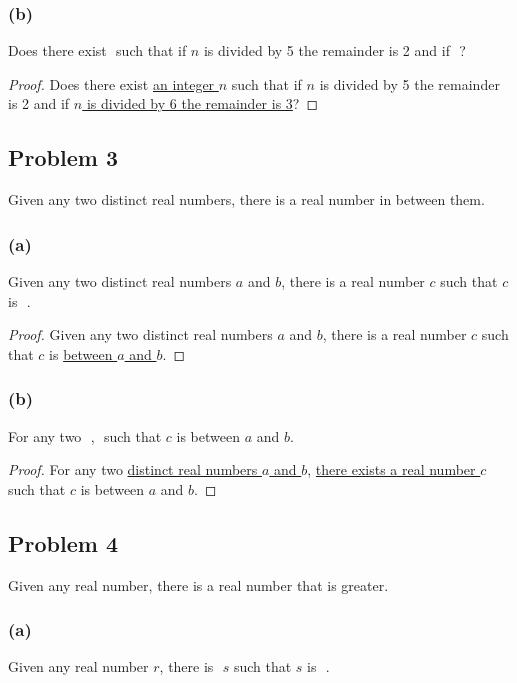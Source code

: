 \documentclass[14pt]{extarticle}
\newcommand{\fbl}{\underline{\hspace{1cm}}\,\,}
\begin{document}
\subsubsection{(b)}
Does there exist \fbl such that if $n$ is divided by 5 the remainder is 2 and if \fbl?

\begin{proof}
    Does there exist \underline{an integer $n$} such that if $n$ is
    divided by 5 the remainder is 2 and if \underline{$n$ is divided by 6 the
        remainder is 3}?
\end{proof}

\subsection{Problem 3}
Given any two distinct real numbers,
there is a real number in between them.

\subsubsection{(a)}
Given any two distinct real numbers $a$ and $b$,
there is a real number $c$ such that $c$ is \fbl.

\begin{proof}
    Given any two distinct real numbers $a$ and $b$, there is a real number $c$ such
    that $c$ is \underline{between $a$ and $b$}.
\end{proof}

\subsubsection{(b)}
For any two \fbl, \fbl such that $c$ is between $a$ and $b$.

\begin{proof}
    For any two \underline{distinct real numbers $a$ and $b$}, \underline{there
        exists a real number $c$} such that $c$ is between $a$ and $b$.
\end{proof}

\subsection{Problem 4}
Given any real number, there is a real number that is greater.

\subsubsection{(a)}
Given any real number $r$, there is \fbl $s$ such that $s$ is \fbl.
\end{document}
